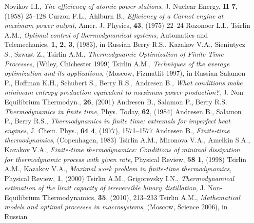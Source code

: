 \documentclass[epjST]{svjour}
\begin{document}
\begin{thebibliography}{}
Novikov I.I., \textit{The efficiency of atomic power stations}, J. Nuclear Energy, \textbf{II 7}, (1958) 25--128
Curzon F.L., Ahlburn B., \textit{Efficiency of a Carnot engine at maximum power output}, Amer. J. Physics, \textbf{43}, (1975) 22--24
Rozonoer L.I., Tsirlin A.M., \textit{Optimal control of thermodynamical systems}, Automatics and Telemechanics, \textbf{1, 2, 3}, (1983), in Russian
Berry R.S., Kazakov V.A., Sieniutycz S., Szwast Z., Tsirlin A.M., \textit{Thermodynamic Optimization of Finite Time Processes}, (Wiley, Chichester 1999)
Tsirlin A.M., \textit{Techniques of the average optimization and its applications}, (Moscow, Fizmatlit 1997), in Russian
Salamon P., Hoffman K.H., Schubert S., Berry R.S., Andresen B., \textit{What conditions make minimum entropy production equivalent to maximum power production?}, J. Non-Equilibrium Thermodyn., \textbf{26}, (2001)
Andresen B., Salamon P., Berry R.S. \textit{Thermodynamics in finite time}, Phys. Today, \textbf{62}, (1984)
Andresen B., Salamon P., Berry R.S., \textit{Thermodynamics in finite time: extremals for imperfect heat engines}, J. Chem. Phys., \textbf{64 4}, (1977), 1571--1577
Andresen B., \textit{Finite-time thermodynamics}, (Copenhagen, 1983)
Tsirlin A.M., Mironova V.A., Amelkin S.A., Kazakov V.A., \textit{Finite-time thermodynamics: Conditions of minimal dissipation for thermodynamic process with given rate}, Physical Review, \textbf{58 1}, (1998)
Tsirlin A.M., Kazakov V.A., \textit{Maximal work problem in finite-time thermodynamics}, Physical Review, \textbf{1}, (2000)
Tsirlin A.M., Grigorevsky I.N., \textit{Thermodynamical estimation of the limit capacity of irreversible binary distillation}, J. Non-Equilibrium Thermodynamics, \textbf{35}, (2010), 213--233
Tsirlin A.M., \textit{Mathematical models and optimal processes in macrosystems}, (Moscow, Science 2006), in Russian

\end{thebibliography}
\end{document}
